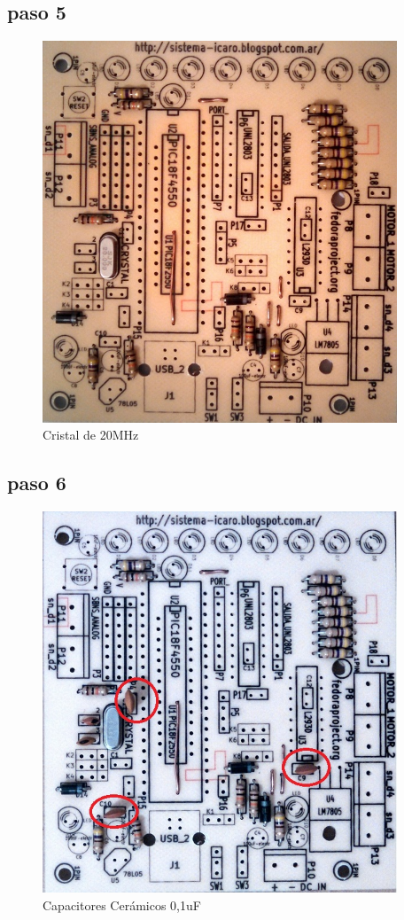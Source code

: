 \documentclass[letterpaper,10pt,english]{sphinxmanual}
\begin{document}
\subsection{paso 5}
\label{np07:paso-5}\begin{figure}[htbp]
\centering
\capstart

\includegraphics[width=300pt]{5b.jpg}
\caption{Cristal de 20MHz}\end{figure}
\newpage

\subsection{paso 6}
\label{np07:paso-6}\begin{figure}[htbp]
\centering
\capstart

\includegraphics[width=300pt]{6b.jpg}
\caption{Capacitores Cerámicos 0,1uF}\end{figure}
\newpage
\end{document}
